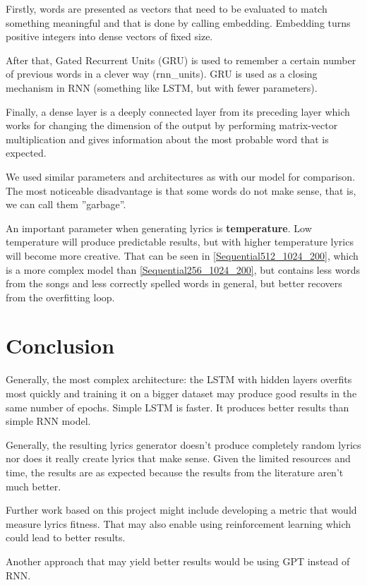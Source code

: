 \documentclass[conference]{IEEEtran}
\begin{document}
Firstly, words are presented as vectors that need to be evaluated to match
something meaningful and that is done by calling embedding. Embedding turns positive integers
into dense vectors of fixed size. 

After that, Gated Recurrent Units (GRU) is used to remember
a certain number of previous words in a clever way (rnn\_units). GRU is used as a closing mechanism in RNN (something like LSTM, but with fewer parameters). 

Finally, a dense layer is a deeply connected layer
from its preceding layer which works for changing the dimension of the output by
performing matrix-vector multiplication and gives information about the most probable word that
is expected.

We used similar parameters and architectures as with our model for comparison. 
The most noticeable disadvantage is that some words do not make sense, that is, we can call them ''garbage''.

An important parameter when generating lyrics is \textbf{temperature}. Low temperature will produce predictable results, but with 
higher temperature lyrics will become more creative. That can be seen in 
\ref{Sequential512_1024_200}, which is a more complex model than
\ref{Sequential256_1024_200}, but contains less words from the songs and less
correctly spelled words in general, but better recovers from the overfitting loop.

\section{Conclusion}
Generally, the most complex architecture: the LSTM with hidden layers overfits
most quickly and training it on a bigger dataset may produce good results in the
same number of epochs. Simple LSTM is faster. It produces better results than
simple RNN model.

Generally,
the resulting lyrics generator doesn't produce completely random lyrics nor does
it really create lyrics that make sense. Given the limited resources and time,
the results are as expected because the results from the literature aren't much
better.

Further work based on this project might include developing a metric that would
measure lyrics fitness. That may also enable using reinforcement learning which
could lead to better results.

Another approach that may yield better results would be using GPT instead of RNN.
\end{document}
